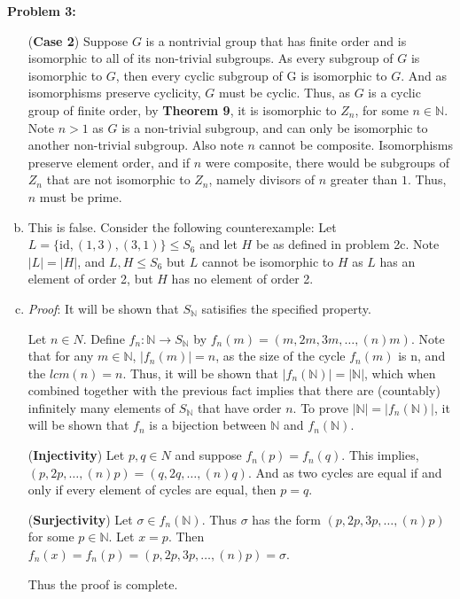 \documentclass[12pt, letterpaper]{article}
\newenvironment{problem}
    [1]
    {\noindent \textbf{Problem #1:}}
    {\vspace{3mm}}
\begin{document}
\begin{problem}{3}
\begin{enumerate}[(a)]
        \bigskip\noindent
        (\textbf{Case 2}) Suppose $G$ is a nontrivial group that has finite order and is isomorphic
        to all of its non-trivial subgroups. As every subgroup of $G$ is isomorphic to $G$, then
        every cyclic subgroup of G is isomorphic to $G$. And as isomorphisms preserve cyclicity,
        $G$ must be cyclic. Thus, as $G$ is a cyclic group of finite order, by \textbf{Theorem 9}, 
        it is isomorphic to $Z_n$, for some $n \in \mathbb{N}$. Note $n > 1$ as $G$ is a non-trivial
        subgroup, and can only be isomorphic to another non-trivial subgroup. Also note $n$ cannot be
        composite. Isomorphisms preserve element order, and if $n$ were composite, there would
        be subgroups of $Z_n$ that are not isomorphic to $Z_n$, namely divisors of $n$ greater than $1$.
        Thus, $n$ must be prime.


        \item This is false. Consider the following counterexample: Let $L = \{\text{id}, (1,3), (3, 1)\} 
        \le S_6$ and let $H$ be as defined in problem 2c. Note $|L| = |H|$, and $L, H \le S_6$ but 
        $L$ cannot be isomorphic to $H$ as $L$ has an element of order 2, but $H$ has no element of order 2.
        
        \item \emph{Proof}: It will be shown that $S_\mathbb{N}$ satisifies the specified
        property.

        \bigskip\noindent
        Let $n \in N$. Define $f_n:\mathbb{N} \rightarrow S_\mathbb{N}$ by 
        $f_n(m) = (m, 2m, 3m, \ldots, (n)m)$. Note that for any $m \in \mathbb{N}$, $|f_n(m)| = n$, 
        as the size of the cycle $f_n(m)$ is n, and the $lcm(n) = n$. Thus, it will be shown that 
        $|f_n(\mathbb{N})| = |\mathbb{N}|$, which when combined together with the previous fact 
        implies that there are (countably) infinitely many elements of $S_\mathbb{N}$ that have 
        order $n$. To prove $|\mathbb{N}| = |f_n(\mathbb{N})|$, it will be shown that $f_n$ is a 
        bijection between $\mathbb{N}$ and $f_n(\mathbb{N})$.
    
        \bigskip\noindent
        (\textbf{Injectivity}) Let $p, q \in N$ and suppose $f_n(p) = f_n(q)$. This implies, 
        $(p, 2p, \ldots, (n)p) = (q, 2q, \ldots, (n)q)$. And as two cycles are equal if and
        only if every element of cycles are equal, then $p = q$.

        \bigskip\noindent
        (\textbf{Surjectivity}) Let $\sigma \in f_n(\mathbb{N})$. Thus $\sigma$ has the form
        $(p, 2p, 3p, \ldots, (n)p)$ for some $p \in \mathbb{N}$. Let $x = p$. Then $f_n(x) =
        f_n(p) = (p, 2p, 3p, \ldots, (n)p) = \sigma$.

        \bigskip\noindent
        Thus the proof is complete.
    \end{enumerate}
\end{problem}
\end{document}
